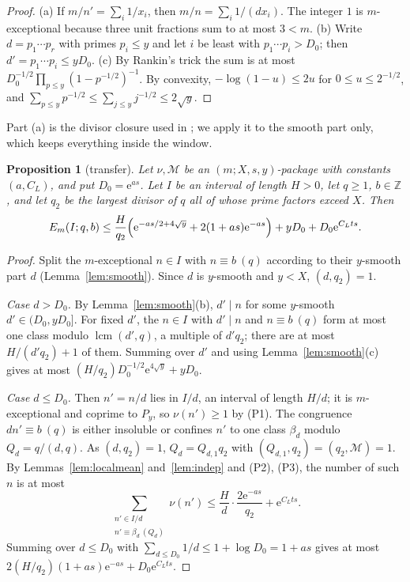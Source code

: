 \documentclass[10pt,reqno]{amsart}
\newtheorem{proposition}[theorem]{Proposition}
\theoremstyle{definition}
\newcommand{\Z}{\mathbb Z}
\newcommand{\M}{\mathcal M}
\newcommand{\lcm}{\operatorname{lcm}}
\newcommand{\e}{\mathrm e}
\begin{document}
\begin{proof}
(a) If $m/n'=\sum_i1/x_i$, then $m/n=\sum_i1/(dx_i)$.  The integer $1$ is
$m$-exceptional because three unit fractions sum to at most $3<m$.
(b) Write $d=p_1\cdots p_r$ with primes $p_i\leq y$ and let $i$ be least
with $p_1\cdots p_i>D_0$; then $d'=p_1\cdots p_i\leq yD_0$.
(c) By Rankin's trick the sum is at most
$D_0^{-1/2}\prod_{p\leq y}(1-p^{-1/2})^{-1}$.  By convexity,
$-\log(1-u)\leq2u$ for $0\leq u\leq2^{-1/2}$, and
$\sum_{p\leq y}p^{-1/2}\leq\sum_{j\leq y}j^{-1/2}\leq2\sqrt y$.
\end{proof}

Part (a) is the divisor closure used in \cite[\S9]{TQ}; we apply it to
the smooth part only, which keeps everything inside the window.

\begin{proposition}[transfer]\label{prop:transfer}
Let $\nu,\M$ be an $(m;X,s,y)$-package with constants $(a,C_L)$, and put
$D_0=\e^{as}$.  Let $I$ be an interval of length $H>0$, let $q\geq1$,
$b\in\Z$, and let $q_2$ be the largest divisor of $q$ all of whose
prime factors exceed $X$.  Then
\[
 E_m(I;q,b)\leq\frac H{q_2}\Bigl(\e^{-as/2+4\sqrt y}+2(1+as)\e^{-as}\Bigr)
 +yD_0+D_0\e^{C_Lts}.
\]
\end{proposition}

\begin{proof}
Split the $m$-exceptional $n\in I$ with $n\equiv b\ (q)$ according to
their $y$-smooth part $d$ (Lemma~\ref{lem:smooth}).  Since $d$ is
$y$-smooth and $y<X$, $(d,q_2)=1$.

\emph{Case $d>D_0$.}  By Lemma~\ref{lem:smooth}(b), $d'\mid n$ for some
$y$-smooth $d'\in(D_0,yD_0]$.  For fixed $d'$, the $n\in I$ with
$d'\mid n$ and $n\equiv b\ (q)$ form at most one class modulo
$\lcm(d',q)$, a multiple of $d'q_2$; there are at most $H/(d'q_2)+1$ of
them.  Summing over $d'$ and using Lemma~\ref{lem:smooth}(c) gives at
most $(H/q_2)D_0^{-1/2}\e^{4\sqrt y}+yD_0$.

\emph{Case $d\leq D_0$.}  Then $n'=n/d$ lies in $I/d$, an interval of
length $H/d$; it is $m$-exceptional and coprime to $P_y$, so
$\nu(n')\geq1$ by (P1).  The congruence $dn'\equiv b\ (q)$ is either
insoluble or confines $n'$ to one class $\beta_d$ modulo $Q_d=q/(d,q)$.
As $(d,q_2)=1$, $Q_d=Q_{d,1}q_2$ with $(Q_{d,1},q_2)=(q_2,\M)=1$.  By
Lemmas~\ref{lem:localmean} and~\ref{lem:indep} and (P2), (P3), the
number of such $n$ is at most
\[
 \sum_{\substack{n'\in I/d\\n'\equiv\beta_d\ (Q_d)}}\nu(n')
 \leq\frac Hd\cdot\frac{2\e^{-as}}{q_2}+\e^{C_Lts}.
\]
Summing over $d\leq D_0$ with $\sum_{d\leq D_0}1/d\leq1+\log D_0=1+as$
gives at most $2(H/q_2)(1+as)\e^{-as}+D_0\e^{C_Lts}$.
\end{proof}
\end{document}
